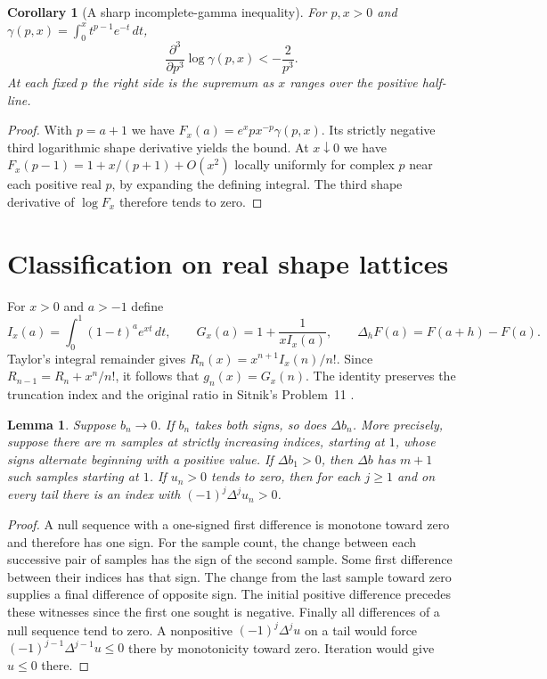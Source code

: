 \documentclass[11pt,a4paper]{article}
\newtheorem{lemma}[theorem]{Lemma}
\newtheorem{corollary}[theorem]{Corollary}
\begin{document}
\begin{corollary}[A sharp incomplete-gamma inequality]
For $p,x>0$ and $\gamma(p,x)=\int_0^x t^{p-1}e^{-t}\,dt$,
\[
 \frac{\partial^3}{\partial p^3}\log\gamma(p,x)<-\frac{2}{p^3}.
\]
At each fixed $p$ the right side is the supremum as $x$ ranges over the positive half-line.
\end{corollary}
\begin{proof}
With $p=a+1$ we have $F_x(a)=e^x p x^{-p}\gamma(p,x)$. Its strictly negative third logarithmic shape derivative yields the bound. At $x\downarrow0$ we have $F_x(p-1)=1+x/(p+1)+O(x^2)$ locally uniformly for complex $p$ near each positive real $p$, by expanding the defining integral. The third shape derivative of $\log F_x$ therefore tends to zero.
\end{proof}

\section{Classification on real shape lattices}

For $x>0$ and $a>-1$ define
\[
 I_x(a)=\int_0^1(1-t)^a e^{xt}\,dt,
 \qquad G_x(a)=1+\frac{1}{xI_x(a)},\qquad
 \Delta_h F(a)=F(a+h)-F(a).
\]
Taylor's integral remainder gives $R_n(x)=x^{n+1}I_x(n)/n!$.
Since $R_{n-1}=R_n+x^n/n!$, it follows that $g_n(x)=G_x(n)$.
The identity preserves the truncation index and the original ratio in
Sitnik's Problem~11 \cite{sitnik}.

\begin{lemma}\label{lem:sign}
Suppose $b_n\to0$. If $b_n$ takes both signs, so does $\Delta b_n$.
More precisely, suppose there are $m$ samples at strictly increasing
indices, starting at $1$, whose signs alternate beginning with a positive
value. If $\Delta b_1>0$, then $\Delta b$ has $m+1$ such samples starting at $1$.
If $u_n>0$ tends to zero, then for each $j\ge1$ and on every tail there is an
index with $(-1)^j\Delta^j u_n>0$.
\end{lemma}
\begin{proof}
A null sequence with a one-signed first difference is monotone toward zero
and therefore has one sign. For the sample count, the change between each
successive pair of samples has the sign of the second sample. Some first
difference between their indices has that sign. The change from the last
sample toward zero supplies a final difference of opposite sign. The initial
positive difference precedes these witnesses since the first one sought is
negative. Finally all differences of a null sequence tend to zero.
A nonpositive $(-1)^j\Delta^j u$ on a tail would force
$(-1)^{j-1}\Delta^{j-1}u\le0$ there by monotonicity toward zero.
Iteration would give $u\le0$ there.
\end{proof}
\end{document}
